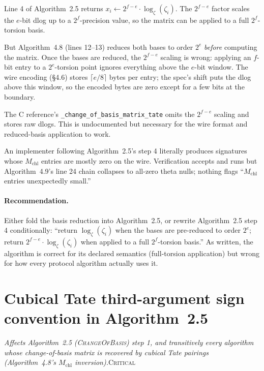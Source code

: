 \documentclass[a4paper,11pt]{article}
\newcommand{\algo}[1]{Algorithm~#1}
\newcommand{\critical}{\textsc{\color{BrickRed}Critical}}
\newcommand{\finding}[2]{\noindent\textit{#1}\hfill#2\par\smallskip}
\begin{document}
Line 4 of \algo{2.5} returns
$x_i \leftarrow 2^{f-e} \cdot \log_{\zeta}(\zeta_i)$.
The $2^{f-e}$ factor scales the $e$-bit dlog up to a $2^f$-precision
value, so the matrix can be applied to a full $2^f$-torsion basis.

But \algo{4.8} (lines 12--13) reduces both bases to order $2^e$
\emph{before} computing the matrix.  Once the bases are reduced,
the $2^{f-e}$ scaling is wrong: applying an $f$-bit entry to a
$2^e$-torsion point ignores everything above the $e$-bit window.
The wire encoding (\S4.6) stores $\lceil e/8 \rceil$ bytes per
entry; the spec's shift puts the dlog above this window, so the
encoded bytes are zero except for a few bits at the boundary.

The C reference's \texttt{\_change\_of\_basis\_matrix\_tate} omits
the $2^{f-e}$ scaling and stores raw dlogs.  This is undocumented
but necessary for the wire format and reduced-basis application
to work.

An implementer following \algo{2.5}'s step 4 literally produces
signatures whose $M_{\mathrm{chl}}$ entries are mostly zero on the
wire.  Verification accepts and runs but \algo{4.9}'s line 24
chain collapses to all-zero theta nulls; nothing flags
``$M_{\mathrm{chl}}$ entries unexpectedly small.''

\paragraph{Recommendation.}
Either fold the basis reduction into \algo{2.5}, or rewrite
\algo{2.5} step 4 conditionally: ``return $\log_{\zeta}(\zeta_i)$
when the bases are pre-reduced to order $2^e$; return
$2^{f-e} \cdot \log_{\zeta}(\zeta_i)$ when applied to a full
$2^f$-torsion basis.''  As written, the algorithm is correct for
its declared semantics (full-torsion application) but wrong for
how every protocol algorithm actually uses it.

\section{Cubical Tate third-argument sign convention in
  \algo{2.5}}
\label{sec:tate-thirdarg-sign}

\finding{Affects \algo{2.5} (\textsc{ChangeOfBasis}) step 1, and
transitively every algorithm whose change-of-basis matrix is
recovered by cubical Tate pairings (\algo{4.8}'s
$M_{\mathrm{chl}}$ inversion).}{\critical}
\end{document}
